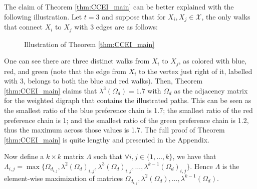 \documentclass{article} %
\theoremstyle{style1}
\theoremstyle{style1}
\theoremstyle{example}
\begin{document}
The claim of Theorem \ref{thm:CCEI_main} can be better explained with the following illustration. Let $t=3$ and suppose that for $X_i,X_j\in\mathcal{X}$, the only walks that connect $X_i$ to $X_j$ with 3 edges are as follows:
\begin{figure}[H]
\centering
{}
\caption{Illustration of Theorem \ref{thm:CCEI_main}} \label{fig:example1_graph}
\end{figure}
One can see there are three distinct walks from $X_i$ to $X_j$, as colored with blue, red, and green (note that the edge from $X_i$ to the vertex just right of it, labelled with 3, belongs to both the blue and red walks). Then, Theorem \ref{thm:CCEI_main} claims that $\lambda^3(\Omega_d) = 1.7$ with $\Omega_d$ as the adjacency matrix for the weighted digraph that contains the illustrated paths. This can be seen as the smallest ratio of the blue preference chain is 1.7; the smallest ratio of the red preference chain is 1; and the smallest ratio of the green preference chain is 1.2, thus the maximum across those values is 1.7. The full proof of Theorem \ref{thm:CCEI_main} is quite lengthy and presented in the Appendix.

Now define a $k\times k$ matrix $\Lambda$ such that $\forall i,j\in\{1,\ldots,k\}$, we have that $\Lambda_{i,j}=\max\{\Omega_{d_{i,j}},\lambda^2(\Omega_d)_{i,j},\lambda^3(\Omega_d)_{i,j},\ldots,\lambda^{k-1}(\Omega_d)_{i,j}\}$. Hence $\Lambda$ is the element-wise maximization of matrices $\Omega_{d_{i,j}},\lambda^2(\Omega_d),\ldots,\lambda^{k-1}(\Omega_d)$. 
\end{document}
